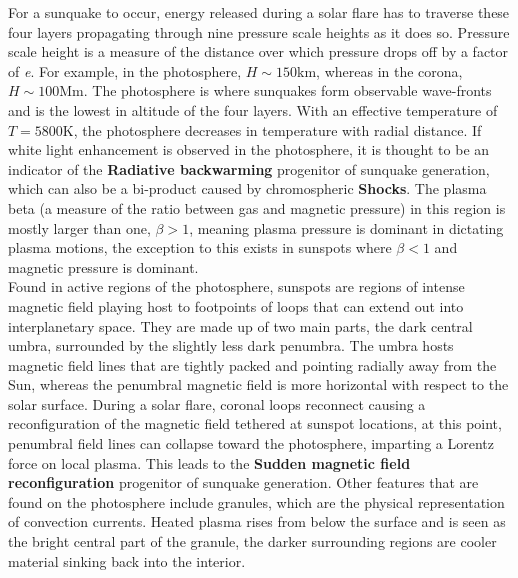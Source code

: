 For a sunquake to occur, energy released during a solar flare has to traverse these four layers propagating through nine pressure scale heights as it does so. Pressure scale height is a measure of the distance over which pressure drops off by a factor of \emph{e}. For example, in the photosphere, $H\sim150$km, whereas in the corona, $H\sim100$Mm. The photosphere is where sunquakes form observable wave-fronts and is the lowest in altitude of the four layers. With an effective temperature of $T=5800$K, the photosphere decreases in temperature with radial distance. If white light enhancement is observed in the photosphere, it is thought to be an indicator of the \textbf{Radiative backwarming} progenitor of sunquake generation, which can also be a bi-product caused by chromospheric \textbf{Shocks}. The plasma beta (a measure of the ratio between gas and magnetic pressure) in this region is mostly larger than one, $\beta >1$, meaning plasma pressure is dominant in dictating plasma motions, the exception to this exists in sunspots where $\beta<1$ and magnetic pressure is dominant. \\

Found in active regions of the photosphere, sunspots are regions of intense magnetic field playing host to footpoints of loops that can extend out into interplanetary space. They are made up of two main parts, the dark central umbra, surrounded by the slightly less dark penumbra. The umbra hosts magnetic field lines that are tightly packed and pointing radially away from the Sun, whereas the penumbral magnetic field is more horizontal with respect to the solar surface. During a solar flare, coronal loops reconnect causing a reconfiguration of the magnetic field tethered at sunspot locations, at this point, penumbral field lines can collapse toward the photosphere, imparting a Lorentz force on local plasma. This leads to the \textbf{Sudden magnetic field reconfiguration} progenitor of sunquake generation. Other features that are found on the photosphere include granules, which are the physical representation of convection currents. Heated plasma rises from below the surface and is seen as the bright central part of the granule, the darker surrounding regions are cooler material sinking back into the interior. \\

